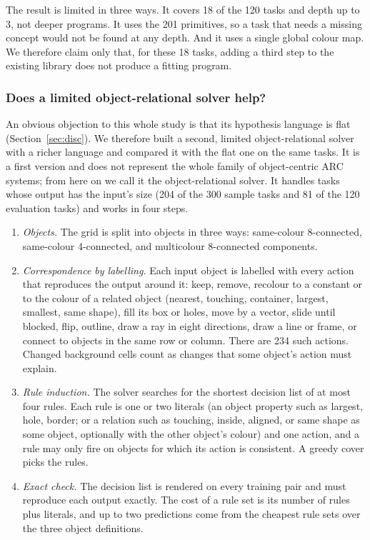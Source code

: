 \documentclass[sigconf,nonacm]{acmart}
\begin{document}
The result is limited in three ways. It covers 18 of the 120 tasks and depth up to 3, not deeper programs. It uses the 201 primitives, so a task that needs a missing concept would not be found at any depth. And it uses a single global colour map. We therefore claim only that, for these 18 tasks, adding a third step to the existing library does not produce a fitting program.

\subsubsection{Does a limited object-relational solver help?}
\label{sec:orel}

An obvious objection to this whole study is that its hypothesis language is flat (Section~\ref{sec:disc}). We therefore built a second, limited object-relational solver with a richer language and compared it with the flat one on the same tasks. It is a first version and does not represent the whole family of object-centric ARC systems; from here on we call it the object-relational solver. It handles tasks whose output has the input's size (204 of the 300 sample tasks and 81 of the 120 evaluation tasks) and works in four steps.
\begin{enumerate}
  \item \emph{Objects.} The grid is split into objects in three ways: same-colour 8-connected, same-colour 4-connected, and multicolour 8-connected components.
  \item \emph{Correspondence by labelling.} Each input object is labelled with every action that reproduces the output around it: keep, remove, recolour to a constant or to the colour of a related object (nearest, touching, container, largest, smallest, same shape), fill its box or holes, move by a vector, slide until blocked, flip, outline, draw a ray in eight directions, draw a line or frame, or connect to objects in the same row or column. There are 234 such actions. Changed background cells count as changes that some object's action must explain.
  \item \emph{Rule induction.} The solver searches for the shortest decision list of at most four rules. Each rule is one or two literals (an object property such as largest, hole, border; or a relation such as touching, inside, aligned, or same shape as some object, optionally with the other object's colour) and one action, and a rule may only fire on objects for which its action is consistent. A greedy cover picks the rules.
  \item \emph{Exact check.} The decision list is rendered on every training pair and must reproduce each output exactly. The cost of a rule set is its number of rules plus literals, and up to two predictions come from the cheapest rule sets over the three object definitions.
\end{enumerate}
\end{document}
